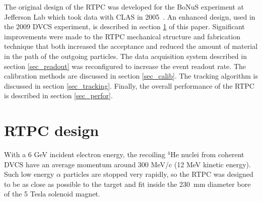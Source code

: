 \documentclass[preprint,5p]{elsarticle}
\begin{document}
The original design of the RTPC was developed for the BoNuS 
experiment at Jefferson Lab which took data with CLAS in 2005~\cite{BONUS-NIM}. An enhanced design, 
used in the 2009 DVCS experiment, is described in section \ref{sec_design} 
of this paper. Significant improvements were made to the RTPC mechanical 
structure and fabrication technique that both increased the acceptance and 
reduced the amount of material in the path of the outgoing particles. The 
data acquisition system described in section \ref{sec_readout} was reconfigured 
to increase the event readout rate. The calibration methods 
are discussed in section \ref{sec_calib}. The tracking algorithm is discussed in section
\ref{sec_tracking}. Finally, the overall performance
of the RTPC is described in section \ref{sec_perfor}.

\section{RTPC design} \label{sec_design}

With a 6 GeV incident electron energy, the recoiling $^{4}$He nuclei from coherent 
DVCS have an average momentum around 300 MeV/c (12 MeV kinetic energy). Such low energy $\alpha$ 
particles are stopped very rapidly, so the RTPC was designed to be as close 
as possible to the target and fit inside the 230~mm diameter bore of the 
5 Tesla solenoid magnet. 
\end{document}

